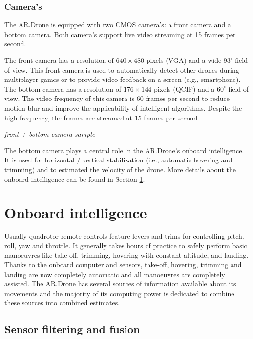 \subsubsection{Camera's}
The AR.Drone is equipped with two CMOS camera's: a front camera and a bottom camera.
Both camera's support live video streaming at 15 frames per second.

The front camera has a resolution of $640 \times 480$ pixels (VGA) and a wide $93^{\circ}$ field of view.
This front camera is used to automatically detect other drones during multiplayer games or to provide video feedback on a screen (e.g., smartphone).
The bottom camera has a resolution of $176 \times 144$ pixels (QCIF) and a $60^{\circ}$ field of view.
The video frequency of this camera is 60 frames per second to reduce motion blur and improve the applicability of intelligent algorithms.
Despite the high frequency, the frames are streamed at 15 frames per second.

\textit{front + bottom camera sample}

The bottom camera plays a central role in the AR.Drone's onboard intelligence.
It is used for horizontal / vertical stabilization (i.e., automatic hovering and trimming) and to estimated the velocity of the drone.
More details about the onboard intelligence can be found in Section \ref{sec:platform_onboard_intelligence}.



\section{Onboard intelligence}
\label{sec:platform_onboard_intelligence}
Usually quadrotor remote controls feature levers and trims for controlling pitch, roll, yaw and throttle.
It generally takes hours of practice to safely perform basic manoeuvres like take-off, trimming, hovering with constant altitude, and landing.
Thanks to the onboard computer and sensors, take-off, hovering, trimming and landing are now completely automatic and all manoeuvres are completely assisted.
The AR.Drone has several sources of information available about its movements and the majority of its computing power is dedicated to combine these sources into combined estimates.

\subsection{Sensor filtering and fusion}

